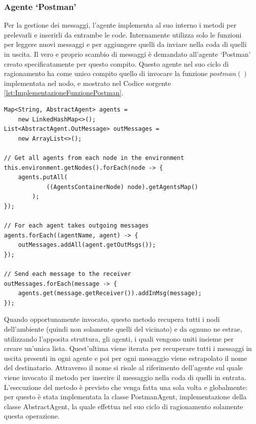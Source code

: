 \subsubsection{Agente `Postman'}
Per la gestione dei messaggi, l'agente implementa al suo interno i metodi per prelevarli e inserirli da entrambe le code. Internamente utilizza solo le funzioni per leggere nuovi messaggi e per aggiungere quelli da inviare nella coda di quelli in uscita.
Il vero e proprio scambio di messaggi è demandato all'agente `Postman' creato specificatamente per questo compito. Questo agente nel suo ciclo di ragionamento ha come unico compito quello di invocare la funzione $postman()$ implementata nel nodo, e mostrato nel Codice sorgente \ref{lst:ImplementazioneFunzionePostman}.
\medskip
\begin{lstlisting}[firstnumber=1,label={lst:ImplementazioneFunzionePostman},caption={Implementazione funzione Postman}]
Map<String, AbstractAgent> agents =
	new LinkedHashMap<>();
List<AbstractAgent.OutMessage> outMessages =
	new ArrayList<>();

// Get all agents from each node in the environment
this.environment.getNodes().forEach(node -> {
    agents.putAll(
    		((AgentsContainerNode) node).getAgentsMap()
    	);
});

// For each agent takes outgoing messages
agents.forEach((agentName, agent) -> {
    outMessages.addAll(agent.getOutMsgs());
});

// Send each message to the receiver
outMessages.forEach(message -> {
    agents.get(message.getReceiver()).addInMsg(message);
});
\end{lstlisting}

Quando opportunamente invocato, questo metodo recupera tutti i nodi dell'ambiente (quindi non solamente quelli del vicinato) e da ognuno ne estrae, utilizzando l'apposita struttura, gli agenti, i quali vengono uniti insieme per creare un'unica lista. Quest'ultima viene iterata per recuperare tutti i messaggi in uscita presenti in ogni agente e poi per ogni messaggio viene estrapolato il nome del destinatario. Attraverso il nome si risale al riferimento dell'agente sul quale viene invocato il metodo per inserire il messaggio nella coda di quelli in entrata.
\\
L'esecuzione del metodo è previsto che venga fatta una sola volta e globalmente: per questo è stata implementata la classe PostmanAgent, implementazione della classe AbstractAgent, la quale effettua nel suo ciclo di ragionamento solamente questa operazione.


